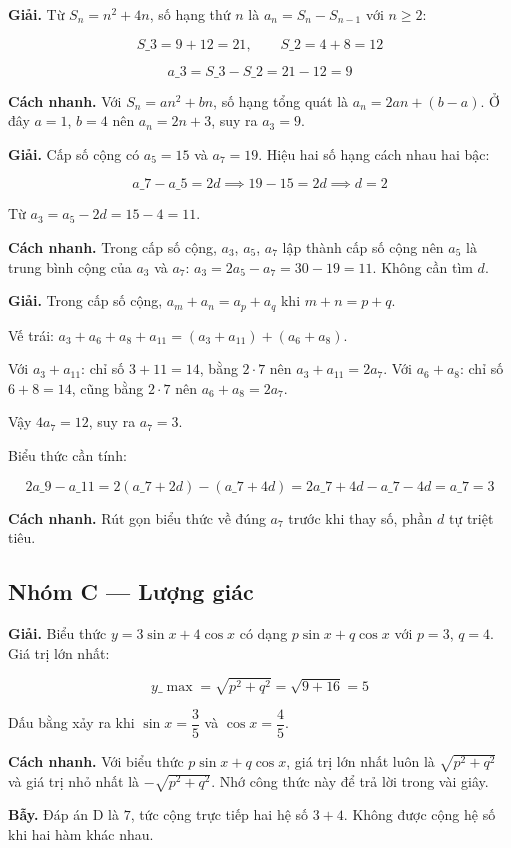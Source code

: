 \documentclass[11pt, a4paper]{article}
\begin{document}
\begin{dapan}[16 — Đáp án D]
\textbf{Giải.} Từ $S_n = n^2 + 4n$, số hạng thứ $n$ là $a_n = S_n - S_{n-1}$ với $n \ge 2$:

$$S\_3 = 9 + 12 = 21, \qquad S\_2 = 4 + 8 = 12$$

$$a\_3 = S\_3 - S\_2 = 21 - 12 = 9$$

\textbf{Cách nhanh.} Với $S_n = an^2 + bn$, số hạng tổng quát là $a_n = 2an + (b - a)$. Ở đây $a = 1$, $b = 4$ nên $a_n = 2n + 3$, suy ra $a_3 = 9$.
\end{dapan}

\begin{dapan}[17 — Đáp án C]
\textbf{Giải.} Cấp số cộng có $a_5 = 15$ và $a_7 = 19$. Hiệu hai số hạng cách nhau hai bậc:

$$a\_7 - a\_5 = 2d \implies 19 - 15 = 2d \implies d = 2$$

Từ $a_3 = a_5 - 2d = 15 - 4 = 11$.

\textbf{Cách nhanh.} Trong cấp số cộng, $a_3$, $a_5$, $a_7$ lập thành cấp số cộng nên $a_5$ là trung bình cộng của $a_3$ và $a_7$: $a_3 = 2a_5 - a_7 = 30 - 19 = 11$. Không cần tìm $d$.
\end{dapan}

\begin{dapan}[18 — Đáp án B]
\textbf{Giải.} Trong cấp số cộng, $a_m + a_n = a_p + a_q$ khi $m + n = p + q$.

Vế trái: $a_3 + a_6 + a_8 + a_{11} = (a_3 + a_{11}) + (a_6 + a_8)$.

Với $a_3 + a_{11}$: chỉ số $3 + 11 = 14$, bằng $2 \cdot 7$ nên $a_3 + a_{11} = 2a_7$.
Với $a_6 + a_8$: chỉ số $6 + 8 = 14$, cũng bằng $2 \cdot 7$ nên $a_6 + a_8 = 2a_7$.

Vậy $4a_7 = 12$, suy ra $a_7 = 3$.

Biểu thức cần tính:

$$2a\_9 - a\_{11} = 2(a\_7 + 2d) - (a\_7 + 4d) = 2a\_7 + 4d - a\_7 - 4d = a\_7 = 3$$

\textbf{Cách nhanh.} Rút gọn biểu thức về đúng $a_7$ trước khi thay số, phần $d$ tự triệt tiêu.
\end{dapan}

\subsection*{Nhóm C — Lượng giác}

\begin{dapan}[19 — Đáp án A]
\textbf{Giải.} Biểu thức $y = 3\sin x + 4\cos x$ có dạng $p\sin x + q\cos x$ với $p = 3$, $q = 4$. Giá trị lớn nhất:

$$y\_{\max} = \sqrt{p^2 + q^2} = \sqrt{9 + 16} = 5$$

Dấu bằng xảy ra khi $\sin x = \dfrac{3}{5}$ và $\cos x = \dfrac{4}{5}$.

\textbf{Cách nhanh.} Với biểu thức $p\sin x + q\cos x$, giá trị lớn nhất luôn là $\sqrt{p^2+q^2}$ và giá trị nhỏ nhất là $-\sqrt{p^2+q^2}$. Nhớ công thức này để trả lời trong vài giây.

\textbf{Bẫy.} Đáp án D là $7$, tức cộng trực tiếp hai hệ số $3 + 4$. Không được cộng hệ số khi hai hàm khác nhau.
\end{dapan}
\end{document}
